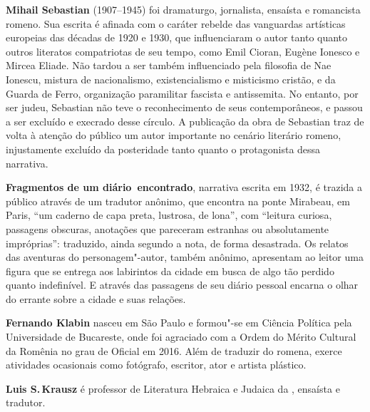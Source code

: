 
\textbf{Mihail Sebastian} (1907--1945) foi dramaturgo, jornalista, ensaísta e romancista romeno. Sua escrita é afinada com o caráter rebelde das vanguardas artísticas europeias das décadas de 1920 e 1930, que influenciaram o autor tanto quanto outros literatos compatriotas de seu tempo, como Emil Cioran, Eugène Ionesco e Mircea Eliade. Não tardou a ser também influenciado pela filosofia de Nae Ionescu, mistura de nacionalismo, existencialismo e misticismo cristão, e da Guarda de Ferro, organização paramilitar fascista e antissemita. No entanto, por ser judeu, Sebastian não teve o reconhecimento de seus contemporâneos, e passou a ser excluído e execrado desse círculo. A publicação da obra de Sebastian traz de volta à atenção do público um autor importante no cenário literário romeno, injustamente excluído da posteridade tanto quanto o protagonista dessa narrativa.


\textbf{Fragmentos de um diário~encontrado}, narrativa escrita em 1932, é trazida a público através de um tradutor anônimo, que encontra na ponte Mirabeau, em Paris, ``um caderno de capa preta, lustrosa, de lona'', com ``leitura curiosa, passagens obscuras, anotações que pareceram estranhas ou absolutamente impróprias'': traduzido, ainda segundo a nota, de forma desastrada. Os relatos das aventuras do personagem"-autor, também anônimo, apresentam ao leitor uma figura que se entrega aos labirintos da cidade em busca de algo tão perdido quanto indefinível. E através das passagens de seu diário pessoal encarna o olhar do errante sobre a cidade e suas relações.


\textbf{Fernando Klabin} nasceu em São Paulo e formou"-se em Ciência Política pela Universidade de Bucareste, onde foi agraciado com a Ordem do Mérito Cultural da Romênia no grau de Oficial em 2016. Além de traduzir do romena, exerce atividades ocasionais como fotógrafo, escritor, ator e artista plástico.

\textbf{Luis S.\,Krausz} é professor de Literatura Hebraica e Judaica da , ensaísta e tradutor. %


